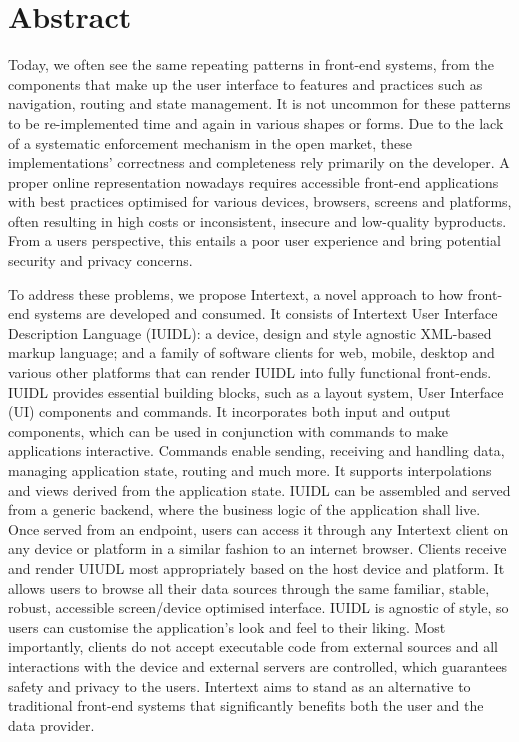 

\section*{Abstract}

Today, we often see the same repeating patterns in front-end systems, from the components that make up the user interface to features and practices such as navigation, routing and state management. It is not uncommon for these patterns to be re-implemented time and again in various shapes or forms. Due to the lack of a systematic enforcement mechanism in the open market, these implementations' correctness and completeness rely primarily on the developer. A proper online representation nowadays requires accessible front-end applications with best practices optimised for various devices, browsers, screens and platforms, often resulting in high costs or inconsistent, insecure and low-quality byproducts. From a users perspective, this entails a poor user experience and bring potential security and privacy concerns. 

To address these problems, we propose Intertext, a novel approach to how front-end systems are developed and consumed. It consists of Intertext User Interface Description Language (IUIDL): a device, design and style agnostic XML-based markup language; and a family of software clients for web, mobile, desktop and various other platforms that can render IUIDL into fully functional front-ends. IUIDL provides essential building blocks, such as a layout system, User Interface (UI) components and commands. It incorporates both input and output components, which can be used in conjunction with commands to make applications interactive. Commands enable sending, receiving and handling data, managing application state, routing and much more. It supports interpolations and views derived from the application state. IUIDL can be assembled and served from a generic backend, where the business logic of the application shall live. Once served from an endpoint, users can access it through any Intertext client on any device or platform in a similar fashion to an internet browser. Clients receive and render UIUDL most appropriately based on the host device and platform. It allows users to browse all their data sources through the same familiar, stable, robust, accessible screen/device optimised interface. IUIDL is agnostic of style, so users can customise the application's look and feel to their liking. Most importantly, clients do not accept executable code from external sources and all interactions with the device and external servers are controlled, which guarantees safety and privacy to the users. Intertext aims to stand as an alternative to traditional front-end systems that significantly benefits both the user and the data provider.